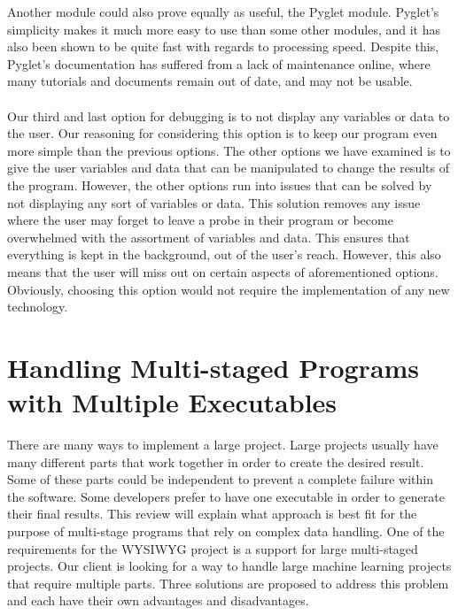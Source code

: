 \documentclass[journal,10pt,onecolumn,compsoc]{IEEEtran} \usepackage[margin=1.0in]{geometry} \usepackage{pdfpages} \usepackage{graphicx}
\begin{document}
Another module could also prove equally as useful, the Pyglet module. 
Pyglet's simplicity makes it much more easy to use than some other modules, and it has also been shown to be quite fast with regards to processing speed. 
Despite this, Pyglet's documentation has suffered from a lack of maintenance online, where many tutorials and documents remain out of date, and may not be usable. \cite{johnson}
\\ 
\\
\noindent Our third and last option for debugging is to not display any variables or data to the user. 
Our reasoning for considering this option is to keep our program even more simple than the previous options. 
The other options we have examined is to give the user variables and data that can be manipulated to change the results of the program. 
However, the other options run into issues that can be solved by not displaying any sort of variables or data.
This solution removes any issue where the user may forget to leave a probe in their program or become overwhelmed with the assortment of variables and data. 
This ensures that everything is kept in the background, out of the user's reach. 
However, this also means that the user will miss out on certain aspects of aforementioned options. 
Obviously, choosing this option would not require the implementation of any new technology.
\\
\newpage

\section{Handling Multi-staged Programs with Multiple Executables}
There are many ways to implement a large project. 
Large projects usually have many different parts that work together in order to create the desired result. 
Some of these parts could be independent to prevent a complete failure within the software. \cite{streamprocessing}
Some developers prefer to have one executable in order to generate their final results. 
This review will explain what approach is best fit for the purpose of multi-stage programs that rely on complex data handling. 
One of the requirements for the WYSIWYG project is a support for large multi-staged projects. 
Our client is looking for a way to handle large machine learning projects that require multiple parts. 
Three solutions are proposed to address this problem and each have their own advantages and disadvantages.
\end{document}
